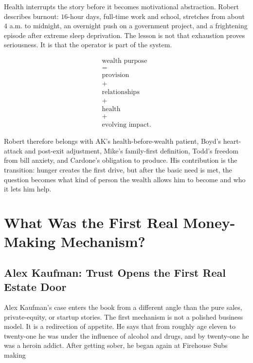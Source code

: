 \documentclass[11pt,oneside]{book}
\begin{document}
Health interrupts the story before it becomes motivational abstraction. Robert describes burnout: \(16\)-hour days, full-time work and school, stretches from about \(4\) a.m. to midnight, an overnight push on a government project, and a frightening episode after extreme sleep deprivation. The lesson is not that exhaustion proves seriousness. It is that the operator is part of the system.

\begin{equation}
\begin{gathered}
\text{wealth purpose}\\
=\\
\text{provision}\\
+\\
\text{relationships}\\
+\\
\text{health}\\
+\\
\text{evolving impact}.
\end{gathered}
\end{equation}

Robert therefore belongs with AK's health-before-wealth patient, Boyd's heart-attack and post-exit adjustment, Mike's family-first definition, Todd's freedom from bill anxiety, and Cardone's obligation to produce. His contribution is the transition: hunger creates the first drive, but after the basic need is met, the question becomes what kind of person the wealth allows him to become and who it lets him help.


\chapter{What Was the First Real Money-Making Mechanism?}

\section{Alex Kaufman: Trust Opens the First Real Estate Door}

Alex Kaufman's case enters the book from a different angle than the pure sales, private-equity, or startup stories. The first mechanism is not a polished business model. It is a redirection of appetite. He says that from roughly age eleven to twenty-one he was under the influence of alcohol and drugs, and by twenty-one he was a heroin addict. After getting sober, he began again at Firehouse Subs making
\end{document}
